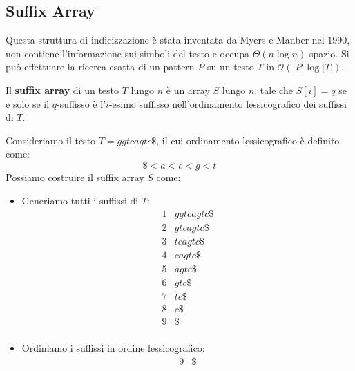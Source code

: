 \subsection{Suffix Array}
Questa struttura di indicizzazione è stata inventata da Myers e Manber nel 1990,
non contiene l'informazione sui simboli del testo e occupa $\Theta(n \log n)$ spazio.
Si può effettuare la ricerca esatta di un pattern $P$  su un testo $T$ in
$\mathcal{O}(|P| \log |T|)$.
\begin{definizione}
    Il \textbf{suffix array} di un testo $T$ lungo $n$ è un array $S$ lungo $n$,
    tale che $S[i]= q$ se e solo se il $q$-suffisso è l'$i$-esimo suffisso
    nell'ordinamento lessicografico dei suffissi di $T$.
\end{definizione}
\begin{esempio}
    Consideriamo il testo $T = ggtcagtc\$$, il cui ordinamento lessicografico è
    definito come:
    \begin{equation}
        \$ < a < c < g < t
    \end{equation}
    Possiamo costruire il suffix array $S$ come:
    \begin{itemize}
        \item Generiamo tutti i suffissi di $T$:
              \begin{equation}
                  \begin{array}{c|l}
                      1 & ggtcagtc\$ \\
                      2 & gtcagtc\$  \\
                      3 & tcagtc\$   \\
                      4 & cagtc\$    \\
                      5 & agtc\$     \\
                      6 & gtc\$      \\
                      7 & tc\$       \\
                      8 & c\$        \\
                      9 & \$         \\
                  \end{array}
              \end{equation}
        \item Ordiniamo i suffissi in ordine lessicografico:
              \begin{equation}
                  \begin{array}{c|l}
                      9 & \$         \\

\end{array}
\end{equation}
\end{itemize}
\end{esempio}

